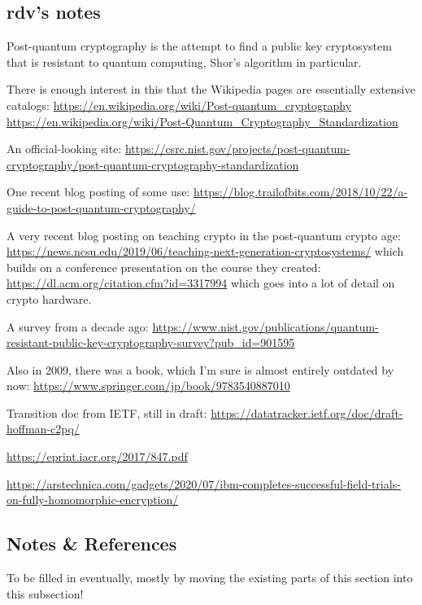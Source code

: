 \subsection{rdv's notes}






Post-quantum cryptography is the attempt to find a public key
cryptosystem that is resistant to quantum computing, Shor's algorithm
in particular.

There is enough interest in this that the Wikipedia pages are
essentially extensive catalogs:
\url{https://en.wikipedia.org/wiki/Post-quantum_cryptography}
\url{https://en.wikipedia.org/wiki/Post-Quantum_Cryptography_Standardization}

An official-looking site:
\url{https://csrc.nist.gov/projects/post-quantum-cryptography/post-quantum-cryptography-standardization}

One recent blog posting of some use:
\url{https://blog.trailofbits.com/2018/10/22/a-guide-to-post-quantum-cryptography/}

A very recent blog posting on teaching crypto in the post-quantum
crypto age:
\url{https://news.ncsu.edu/2019/06/teaching-next-generation-cryptosystems/}
which builds on a conference presentation on the course they created:
\url{https://dl.acm.org/citation.cfm?id=3317994}
which goes into a lot of detail on crypto hardware.

A survey from a decade ago:
\url{https://www.nist.gov/publications/quantum-resistant-public-key-cryptography-survey?pub_id=901595}

Also in 2009, there was a book, which I'm sure is almost entirely
outdated by now:
\url{https://www.springer.com/jp/book/9783540887010}

Transition doc from IETF, still in draft:
\url{https://datatracker.ietf.org/doc/draft-hoffman-c2pq/}

\url{https://eprint.iacr.org/2017/847.pdf}

\url{https://arstechnica.com/gadgets/2020/07/ibm-completes-successful-field-trials-on-fully-homomorphic-encryption/}

\subsection{Notes \& References}

To be filled in eventually, mostly by moving the existing parts of
this section into this subsection!



